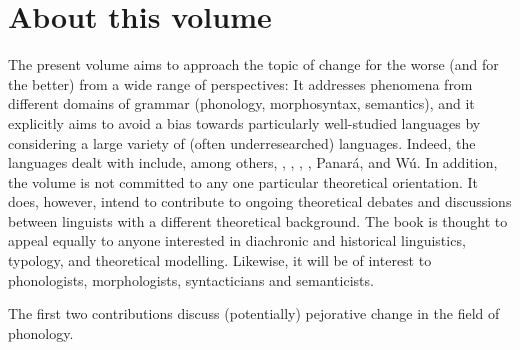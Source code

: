 \documentclass[output=paper,colorlinks,citecolor=brown]{langscibook}
\begin{document}
\section*{About this volume}

The present volume aims to approach the topic of change for the worse (and for the better) from a wide range of perspectives: It addresses phenomena from different domains of grammar (phonology, morphosyntax, semantics), and it explicitly aims to avoid a bias towards particularly well-studied languages by considering a large variety of (often underresearched) languages. Indeed, the languages dealt with include, among others, , , ,  , Panará,  and W\'{u}. In addition, the volume is not committed to any one particular theoretical orientation. It does, however, intend  to contribute to ongoing theoretical debates and discussions between linguists with a different theoretical background. The book is thought to appeal equally to anyone interested in diachronic and historical linguistics, typology, and theoretical modelling. Likewise, it will be of interest to phonologists, morphologists, syntacticians and semanticists.

The first two contributions discuss (potentially) pejorative change in the field of phonology.
\end{document}
